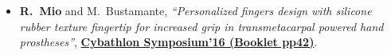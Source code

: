 \documentclass[a4paper,10pt]{article}
\begin{document}
\begin{itemize}
  \item \textbf{R.\ Mio} and M.\ Bustamante,
        \textit{``Personalized fingers design with silicone rubber texture fingertip for increased
        grip in transmetacarpal powered hand prostheses''},
        \href{https://ethz.ch/content/dam/ethz/special-interest/conference-websites-dam/cybathlon-symp-dam/documents/Cybathlon\%20Symposium\%20Booklet.pdf}{\textbf{Cybathlon Symposium'16 (Booklet pp42)}}.
\end{itemize}
\end{document}
